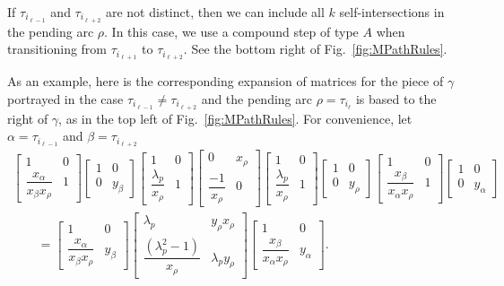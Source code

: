 \documentclass[11pt]{article}
\numberwithin{equation}{section}
\begin{document}
If $\tau_{i_{\ell-1}}$ and $\tau_{i_{\ell+2}}$ are not distinct, then we can include all $k$ self-intersections in the pending arc $\rho$. In this case, we use a compound step of type $A$ when transitioning from $\tau_{i_{\ell+1}}$ to $\tau_{i_{\ell+2}}$. See the bottom right of Fig.~\ref{fig:MPathRules}.

\begin{Example} As an example, here is the corresponding expansion of matrices for the piece of $\gamma$ portrayed in the case $\tau_{i_{\ell-1}} \neq \tau_{i_{\ell+2}}$ and the pending arc $\rho = \tau_{i_\ell}$ is based to the right of $\gamma$, as in the top left of Fig.~\ref{fig:MPathRules}. For convenience, let $\alpha = \tau_{i_{\ell-1}}$ and $\beta = \tau_{i_{\ell + 2}}$
 \begin{gather*}
 \begin{bmatrix} 1 & 0 \\ \dfrac{x_\alpha}{x_\beta x_\rho} & 1 \end{bmatrix}
 \begin{bmatrix} 1 & 0 \\ 0 & y_{\beta} \end{bmatrix} \begin{bmatrix} 1 & 0 \\ \dfrac{\lambda_p}{x_\rho} & 1 \end{bmatrix}
\begin{bmatrix} 0 & x_\rho \\ \dfrac{-1}{x_\rho} & 0 \end{bmatrix}
 \begin{bmatrix} 1 & 0 \\ \dfrac{\lambda_p}{x_\rho} & 1 \end{bmatrix}
 \begin{bmatrix} 1 & 0 \\ 0 & y_{\rho} \end{bmatrix}
 \begin{bmatrix} 1 & 0 \\ \dfrac{x_\beta}{x_\alpha x_\rho} & 1 \end{bmatrix}
 \begin{bmatrix} 1 & 0 \\ 0 & y_{\alpha} \end{bmatrix}
\\
\qquad{}
= \begin{bmatrix} 1 & 0 \\ \dfrac{x_\alpha}{x_\beta x_\rho} & y_\beta \end{bmatrix}
\begin{bmatrix} \lambda_p & y_{\rho} x_{\rho} \\ \dfrac{(\lambda_p^2 - 1)}{x_{\rho}} & \lambda_p y_{\rho}\end{bmatrix}
 \begin{bmatrix} 1 & 0 \\ \dfrac{x_\beta}{x_\alpha x_\rho} & y_\alpha \end{bmatrix}.
\end{gather*}


\end{Example}
\end{document}
